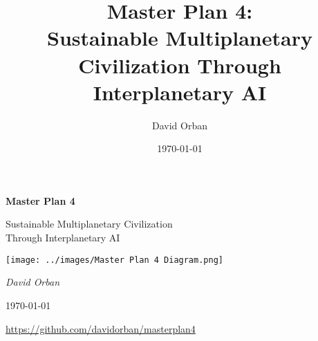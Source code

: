 \documentclass[11pt,a4paper]{report}
\title{Master Plan 4: \\ \Large\textbf{Sustainable Multiplanetary Civilization Through Interplanetary AI}}
\author{David Orban}
\date{\today}
\begin{document}
\begin{titlepage}
    \centering
    \vspace*{2cm}
    {\Huge\bfseries Master Plan 4\par}
    \vspace{0.5cm}
    {\LARGE Sustainable Multiplanetary Civilization\\Through Interplanetary AI\par}
    \vspace{2cm}
    \texttt{[image: ../images/Master Plan 4 Diagram.png]}\par
    \vspace{2cm}
    {\Large\itshape David Orban\par}
    \vspace{0.5cm}
    {\large \today\par}
    \vfill
    {\small \url{https://github.com/davidorban/masterplan4}}
\end{titlepage}

\tableofcontents










\end{document}
